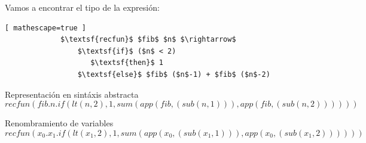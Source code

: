 \bigskip
\bigskip


    \begin{exercise}
        Vamos a encontrar el tipo de la expresión:
            \begin{lstlisting}[ mathescape=true ]
             $\textsf{recfun}$ $fib$ $n$ $\rightarrow$ 
                 $\textsf{if}$ ($n$ < 2) 
                    $\textsf{then}$ 1
                 $\textsf{else}$ $fib$ ($n$-1) + $fib$ ($n$-2)
           \end{lstlisting}
        \begin{description}
	 \item Representación en sintáxis abstracta	
 	        $$recfun(fib.n.if(lt(n , 2), 1, sum(app(fib, (sub(n,1))),app(fib, (sub(n,2))))))$$

            \item Renombramiento de variables
                $$recfun(x_0.x_1.if(lt(x_1 , 2), 1, sum(app(x_0, (sub(x_1,1))), app(x_0, (sub(x_1,2))))))$$


\end{description}
\end{exercise}
